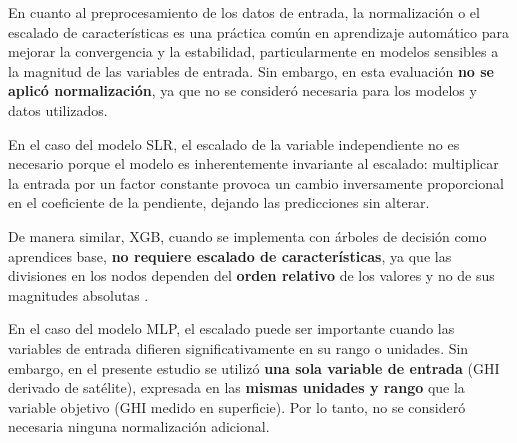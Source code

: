 \documentclass[letterpaper,12pt, twoside]{report}
\providecommand{\DIFdeltex}[1]{{\protect\color{red} \scriptsize #1}} %
\providecommand{\DIFdel}[1]{\texorpdfstring{\DIFdeltex{#1}}{}} %
\begin{document}
\DIFdel{En cuanto al preprocesamiento de los datos de entrada, la normalización o el escalado de características es una práctica común en aprendizaje automático para mejorar la convergencia y la estabilidad, particularmente en modelos sensibles a la magnitud de las variables de entrada. Sin embargo, en esta evaluación \textbf{no se aplicó normalización}, ya que no se consideró necesaria para los modelos y datos utilizados.  
}%

\DIFdel{En el caso del modelo SLR, el escalado de la variable independiente no es necesario porque el modelo es inherentemente invariante al escalado: multiplicar la entrada por un factor constante provoca un cambio inversamente proporcional en el coeficiente de la pendiente, dejando las predicciones sin alterar.  
}%

\DIFdel{De manera similar, XGB, cuando se implementa con árboles de decisión como aprendices base, \textbf{no requiere escalado de características}, ya que las divisiones en los nodos dependen del \textbf{orden relativo} de los valores y no de sus magnitudes absolutas \cite{Soria2022, Chen2016}.  
}%

\DIFdel{En el caso del modelo MLP, el escalado puede ser importante cuando las variables de entrada difieren significativamente en su rango o unidades. Sin embargo, en el presente estudio se utilizó \textbf{una sola variable de entrada} (GHI derivado de satélite), expresada en las \textbf{mismas unidades y rango} que la variable objetivo (GHI medido en superficie). Por lo tanto, no se consideró necesaria ninguna normalización adicional.}%

\end{document}
